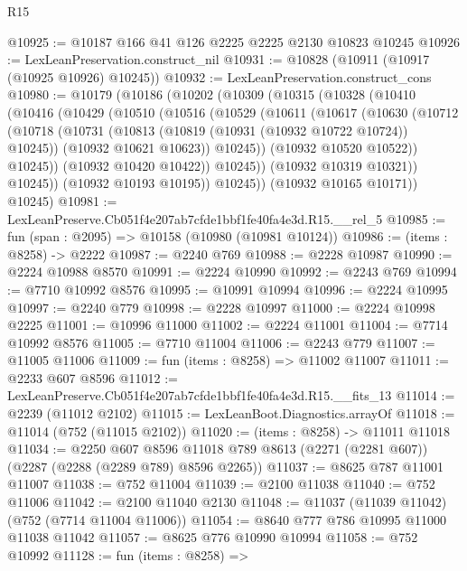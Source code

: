 \begin{lexlean}{R15}
\begin{coremodule}
@10925 := @10187 @166 @41 @126 @2225 @2225 @2130 @10823 @10245
@10926 := LexLeanPreservation.construct_nil
@10931 := @10828 (@10911 (@10917 (@10925 @10926) @10245))
@10932 := LexLeanPreservation.construct_cons
@10980 := @10179
    (@10186
      (@10202
        (@10309
          (@10315
            (@10328
              (@10410
                (@10416
                  (@10429
                    (@10510
                      (@10516
                        (@10529
                          (@10611
                            (@10617
                              (@10630
                                (@10712
                                  (@10718
                                    (@10731
                                      (@10813 (@10819 (@10931 (@10932 @10722 @10724)) @10245))
                                      (@10932 @10621 @10623))
                                    @10245))
                                (@10932 @10520 @10522))
                              @10245))
                          (@10932 @10420 @10422))
                        @10245))
                    (@10932 @10319 @10321))
                  @10245))
              (@10932 @10193 @10195))
            @10245))
        (@10932 @10165 @10171))
      @10245)
@10981 := LexLeanPreserve.Cb051f4e207ab7cfde1bbf1fe40fa4e3d.R15.__rel_5
@10985 := fun (span : @2095) => @10158 (@10980 (@10981 @10124))
@10986 := (items : @8258) -> @2222
@10987 := @2240 @769
@10988 := @2228 @10987
@10990 := @2224 @10988 @8570
@10991 := @2224 @10990
@10992 := @2243 @769
@10994 := @7710 @10992 @8576
@10995 := @10991 @10994
@10996 := @2224 @10995
@10997 := @2240 @779
@10998 := @2228 @10997
@11000 := @2224 @10998 @2225
@11001 := @10996 @11000
@11002 := @2224 @11001
@11004 := @7714 @10992 @8576
@11005 := @7710 @11004
@11006 := @2243 @779
@11007 := @11005 @11006
@11009 := fun (items : @8258) => @11002 @11007
@11011 := @2233 @607 @8596
@11012 := LexLeanPreserve.Cb051f4e207ab7cfde1bbf1fe40fa4e3d.R15.__fits_13
@11014 := @2239 (@11012 @2102)
@11015 := LexLeanBoot.Diagnostics.arrayOf
@11018 := @11014 (@752 (@11015 @2102))
@11020 := (items : @8258) -> @11011 @11018
@11034 := @2250
    @607
    @8596
    @11018
    @789
    @8613
    (@2271 (@2281 @607))
    (@2287 (@2288 (@2289 @789) @8596 @2265))
@11037 := @8625 @787 @11001 @11007
@11038 := @752 @11004
@11039 := @2100 @11038
@11040 := @752 @11006
@11042 := @2100 @11040 @2130
@11048 := @11037 (@11039 @11042) (@752 (@7714 @11004 @11006))
@11054 := @8640 @777 @786 @10995 @11000 @11038 @11042
@11057 := @8625 @776 @10990 @10994
@11058 := @752 @10992
@11128 := fun (items : @8258) =>

\end{coremodule}
\end{lexlean}
